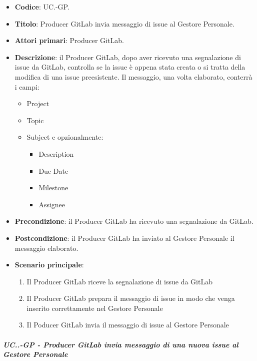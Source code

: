 		\begin{itemize}
			\newpage
			\item \textbf{Codice}: UC\theuccount.\thesubuccount-GP.
			\item \textbf{Titolo}:  Producer GitLab invia messaggio di issue al Gestore Personale.
			\item \textbf{Attori primari}: Producer GitLab.
			\item \textbf{Descrizione}: il Producer GitLab, dopo aver ricevuto una segnalazione di issue da GitLab, controlla se la issue è appena stata creata o si tratta della modifica di una issue preesistente. Il messaggio, una volta elaborato, conterrà i campi:
			\begin{itemize}
				\item Project
				\item Topic
				\item Subject e opzionalmente:
				\begin{itemize}
					\item Description
					\item Due Date
					\item Milestone
					\item Assignee
				\end{itemize}
			\end{itemize}
			\item \textbf{Precondizione}: il Producer GitLab ha ricevuto una segnalazione da GitLab.
			\item \textbf{Postcondizione}: il Producer GitLab ha inviato al Gestore Personale il messaggio  \newline elaborato.
			\item \textbf{Scenario principale}: 
			\begin{enumerate}
				\item Il Producer GitLab riceve la segnalazione di issue da GitLab
				\item Il Producer GitLab prepara il messaggio di issue in modo che venga inserito  \newline correttamente nel Gestore Personale
				\item Il Poducer GitLab invia il messaggio di issue al Gestore Personale
			\end{enumerate}
			
		\end{itemize}
		
		\subparagraph{UC\theuccount.\thesubuccount.\thesubsubuccount-GP - Producer GitLab invia messaggio di una nuova issue al Gestore Personale}
			
